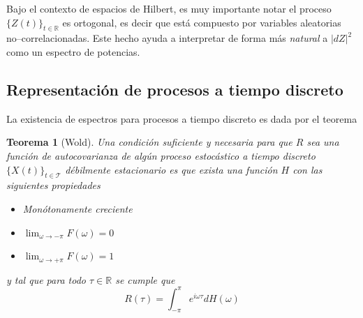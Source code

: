 \documentclass[12pt,letterpaper]{book}
\newtheorem{teorema}{Teorema}[chapter]
\newcommand{\R}{\mathbb{R}}
\newcommand{\intPI}{\int_{-\pi}^{\pi}}
\newcommand{\abso}[1]{\left| #1 \right|}
\newcommand{\xt}{$\{X(t)\}_{t\in \mathcal{T}}$ }
\begin{document}
Bajo el contexto de espacios de Hilbert, es muy importante notar el proceso $\{Z(t)\}_{t\in \R}$ es ortogonal, es decir que está compuesto por variables aleatorias no--correlacionadas.
%
Este hecho ayuda a interpretar de forma más \textit{natural} a $\abso{dZ}^2$ como un espectro de potencias.

\subsection{Representación de procesos a tiempo discreto}

La existencia de espectros para procesos a tiempo discreto es dada por el teorema

\begin{teorema}[Wold]
Una condición suficiente y necesaria para que $R$ sea una función de autocovarianza de 
algún proceso estocástico a tiempo discreto \xt débilmente estacionario es que exista 
una función $H$ con las siguientes propiedades
\begin{itemize}
\item Monótonamente creciente
\item $\lim_{\omega \longrightarrow -\pi} F(\omega) = 0$
\item $\lim_{\omega \longrightarrow +\pi} F(\omega) = 1$
\end{itemize}
y tal que para todo $\tau \in \R$ se cumple que
\begin{equation*}
R(\tau) = \intPI e^{i \omega \tau} dH(\omega)
\end{equation*}
\label{t_wold}
\end{teorema}
\end{document}
